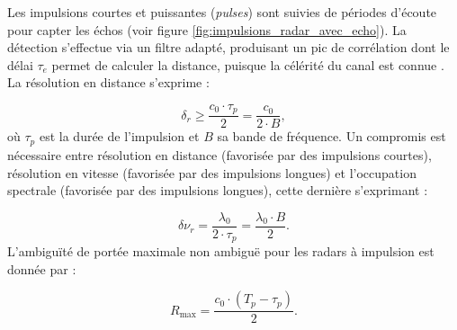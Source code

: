 Les impulsions courtes et puissantes (\emph{pulses}) sont suivies de périodes d’écoute pour capter les échos (voir figure \ref{fig:impulsions_radar_avec_echo}). La détection s’effectue via un filtre adapté, produisant un pic de corrélation dont le délai $\tau_e$ permet de calculer la distance, puisque la célérité du canal est connue \cite{richards2010}. La résolution en distance s’exprime :

\begin{equation}
    \delta_r \ge \frac{c_0 \cdot \tau_p}{2} = \frac{c_0}{2 \cdot B},
    \label{eq:resolution_distance_pulse}
\end{equation}
où $\tau_p$ est la durée de l’impulsion et $B$ sa bande de fréquence. Un compromis est nécessaire entre résolution en distance (favorisée par des impulsions courtes), résolution en vitesse (favorisée par des impulsions longues) et l'occupation spectrale (favorisée par des impulsions longues), cette dernière s’exprimant :

\begin{equation}
    \delta\nu_r = \frac{\lambda_0}{2\cdot\tau_p} = \frac{\lambda_0\cdot B}{2}.
    \label{eq:resolution_vitesse_impulsions}
\end{equation}
L’ambiguïté de portée maximale non ambiguë pour les radars à impulsion est donnée par \cite{skolnik2001,radartutorial} :

\begin{equation}
    R_{\max} = \frac{c_0\cdot(T_p - \tau_p)}{2}.
    \label{eq:resolution_distance_max_radar_pulse}
\end{equation}

